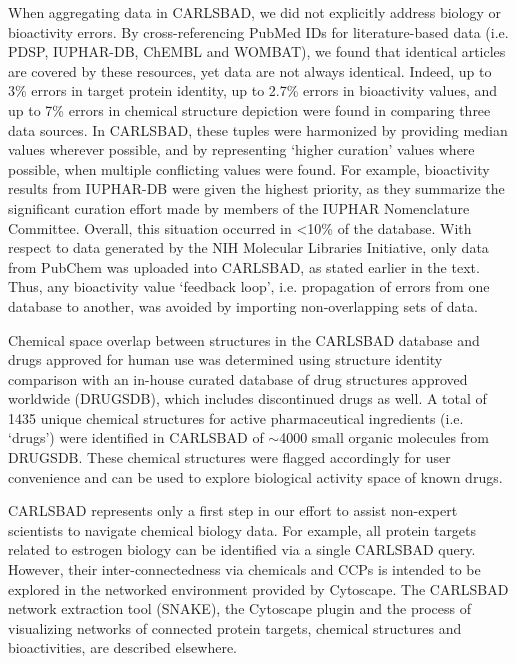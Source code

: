 When aggregating data in CARLSBAD, we did not explicitly address biology or bioactivity errors. By cross-referencing PubMed IDs for literature-based data (i.e. PDSP, IUPHAR-DB, ChEMBL and WOMBAT), we found that identical articles are covered by these resources, yet data are not always identical. Indeed, up to 3\% errors in target protein identity, up to 2.7\% errors in bioactivity values, and up to 7\% errors in chemical structure depiction were found in comparing three data sources. In CARLSBAD, these tuples were harmonized by providing median values wherever possible, and by representing ‘higher curation’ values where possible, when multiple conflicting values were found. For example, bioactivity results from IUPHAR-DB were given the highest priority, as they summarize the significant curation effort made by members of the IUPHAR Nomenclature Committee. Overall, this situation occurred in \textless 10\% of the database. With respect to data generated by the NIH Molecular Libraries Initiative\cite{Austin2004-qc}, only data from PubChem was uploaded into CARLSBAD, as stated earlier in the text. Thus, any bioactivity value ‘feedback loop’, i.e. propagation of errors from one database to another, was avoided by importing non-overlapping sets of data.

Chemical space overlap between structures in the CARLSBAD database and drugs approved for human use was determined using structure identity comparison with an in-house curated database of drug structures approved worldwide (DRUGSDB), which includes discontinued drugs as well\cite{Oprea2010-kd,Manallack2013-qm}. A total of 1435 unique chemical structures for active pharmaceutical ingredients (i.e. ‘drugs’) were identified in CARLSBAD of $\sim$4000 small organic molecules from DRUGSDB. These chemical structures were flagged accordingly for user convenience and can be used to explore biological activity space of known drugs.

CARLSBAD represents only a first step in our effort to assist non-expert scientists to navigate chemical biology data. For example, all protein targets related to estrogen biology can be identified via a single CARLSBAD query. However, their inter-connectedness via chemicals and CCPs is intended to be explored in the networked environment provided by Cytoscape\cite{Shannon2003-ph}. The CARLSBAD network extraction tool (SNAKE), the Cytoscape plugin and the process of visualizing networks of connected protein targets, chemical structures and bioactivities, are described elsewhere.

